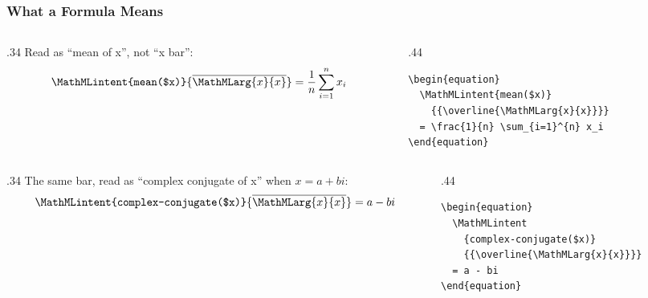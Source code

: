 \documentclass{ltx-talk}
\begin{document}
\begin{frame*}
  \frametitle{What a Formula Means}
  \begin{columns}
    \begin{column}{.34\textwidth}
      Read as ``mean of x'', not ``x bar'':
      \begin{equation}
        \MathMLintent{mean($x)}{{\overline{\MathMLarg{x}{x}}}}
        = \frac{1}{n} \sum_{i=1}^{n} x_i
      \end{equation}
    \end{column}
    \begin{column}{.44\textwidth}
\small
\begin{verbatim}
\begin{equation}
  \MathMLintent{mean($x)}
    {{\overline{\MathMLarg{x}{x}}}}
  = \frac{1}{n} \sum_{i=1}^{n} x_i
\end{equation}
\end{verbatim}
    \end{column}
  \end{columns}

  \begin{columns}
    \begin{column}{.34\textwidth}
      The same bar, read as ``complex conjugate of x'' when $x = a + bi$:
      \begin{equation}
        \MathMLintent{complex-conjugate($x)}{{\overline{\MathMLarg{x}{x}}}}
        = a - bi
      \end{equation}
    \end{column}
    \begin{column}{.44\textwidth}
\small
\begin{verbatim}
\begin{equation}
  \MathMLintent
    {complex-conjugate($x)}
    {{\overline{\MathMLarg{x}{x}}}}
  = a - bi
\end{equation}
\end{verbatim}
    \end{column}
  \end{columns}
\end{frame*}
\end{document}
